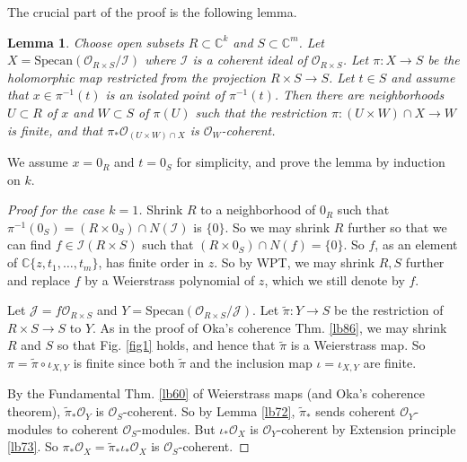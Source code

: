 \documentclass[12pt,b5paper,notitlepage]{report}
\theoremstyle{definition}
\theoremstyle{plain}
\newtheorem{lm}[df]{Lemma}
\newcommand{\mc}{\mathcal}
\newcommand{\wtd}{\widetilde}
\newcommand{\scr}{\mathscr}
\newcommand{\Cbb}{\mathbb C}
\newcommand{\Specan}{\mathrm{Specan}}
\numberwithin{equation}{section}
\begin{document}
The crucial part of the proof is the following lemma.

\begin{lm}\label{lb78}
Choose open subsets $R\subset\Cbb^k$ and $S\subset \Cbb^m$. Let $X=\Specan(\scr O_{R\times S}/\mc I)$ where $\mc I$ is a coherent ideal of $\scr O_{R\times S}$. Let $\pi:X\rightarrow S$ be the holomorphic map restricted from the projection $R\times S\rightarrow S$. Let $t\in S$ and assume that $x\in\pi^{-1}(t)$ is an isolated point of $\pi^{-1}(t)$. Then there are neighborhoods $U\subset R$ of $x$ and $W\subset S$ of $\pi(U)$ such that the restriction $\pi:(U\times W)\cap X\rightarrow W$ is finite, and that $\pi_*\scr O_{(U\times W)\cap X}$ is $\scr O_W$-coherent.
\end{lm}


We assume $x=0_R$ and $t=0_S$ for simplicity, and prove the lemma by induction on $k$. 

\begin{proof}[Proof for the case $k=1$]
Shrink $R$ to a neighborhood of $0_R$ such that $\pi^{-1}(0_S)=(R\times 0_S)\cap N(\mc I)$ is $\{0\}$. So we may shrink $R$ further so that we can find $f\in\mc I(R\times S)$ such that $(R\times 0_S)\cap N(f)=\{0\}$. So $f$, as an element of $\Cbb\{z,t_1,\dots,t_m\}$, has finite order in $z$. So by WPT, we may shrink $R,S$ further and replace $f$ by a Weierstrass polynomial of $z$, which we still denote by $f$.

Let $\mc J=f\scr O_{R\times S}$ and $Y=\Specan(\scr O_{R\times S}/\mc J)$. Let $\wtd\pi:Y\rightarrow S$ be the restriction of $R\times S\rightarrow S$ to $Y$. As in the proof of Oka's coherence Thm. \ref{lb86}, we may shrink $R$ and $S$ so that Fig. \ref{fig1} holds, and hence that $\wtd \pi$ is a Weierstrass map.  So $\pi=\wtd\pi\circ\iota_{X,Y}$ is finite since both $\wtd\pi$ and the inclusion map $\iota=\iota_{X,Y}$ are finite.

By the Fundamental Thm. \ref{lb60} of Weierstrass maps (and Oka's coherence theorem), $\wtd\pi_*\scr O_Y$ is $\scr O_S$-coherent. So by Lemma \ref{lb72}, $\wtd\pi_*$ sends coherent $\scr O_Y$-modules to coherent $\scr O_S$-modules. But $\iota_*\scr O_X$ is $\scr O_Y$-coherent by Extension principle \ref{lb73}. So $\pi_*\scr O_X=\wtd\pi_*\iota_*\scr O_X$ is $\scr O_S$-coherent.
\end{proof}
\end{document}
